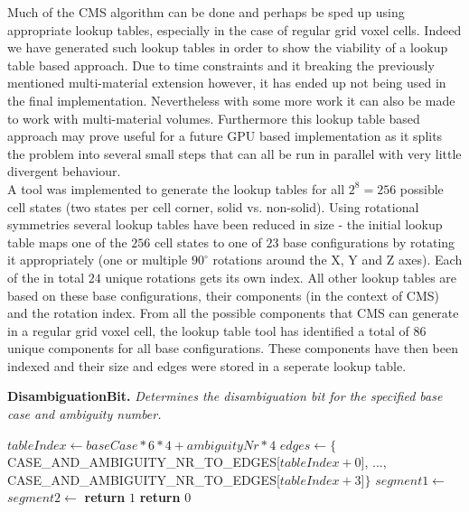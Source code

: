 Much of the CMS algorithm can be done and perhaps be sped up using appropriate lookup tables, especially in the case of regular grid voxel cells. Indeed we have generated such lookup tables in order to show
the viability of a lookup table based approach. Due to time constraints and it breaking the previously mentioned multi-material extension however, it has ended up not being used in the final implementation.
Nevertheless with some more work it can also be made to work with multi-material volumes. Furthermore this lookup table based approach may prove useful for a future GPU based implementation as it splits
the problem into several small steps that can all be run in parallel with very little divergent behaviour.\\
A tool was implemented to generate the lookup tables for all $2^8 = 256$ possible cell states (two states per cell corner, solid vs. non-solid). Using rotational symmetries several lookup tables have been reduced in size - the initial lookup table maps one of the $256$ cell states to one of $23$ base configurations by rotating it appropriately (one or multiple $90^{\circ}$ rotations around the X, Y and Z axes). Each of the in total $24$ unique rotations gets its own index.
All other lookup tables are based on these base configurations, their components (in the context of CMS) and the rotation index.
From all the possible components that CMS can generate in a regular grid voxel cell, the lookup table tool has identified a total of $86$ unique components for all base configurations. These components have
then been indexed and their size and edges were stored in a seperate lookup table.\\

\begin{algorithm}[H]
\caption{\textbf{DisambiguationBit.} \textit{Determines the disambiguation bit for the specified base case and ambiguity number.}}\label{alg:cms_lt_disambiguation_bit}
\begin{algorithmic}[1]
	\State $tableIndex \gets baseCase * 6 * 4 + ambiguityNr * 4$
	\State $edges \gets \{$CASE\_AND\_AMBIGUITY\_NR\_TO\_EDGES[$tableIndex + 0$],
	\Statex ..., CASE\_AND\_AMBIGUITY\_NR\_TO\_EDGES[$tableIndex + 3$]$\}$
	\State $segment1 \gets $ 
	\State {}
	\State $segment2 \gets $
	\State {}
		\State \textbf{return} $1$
	\Else
		\State \textbf{return} $0$
	\EndIf
\EndProcedure
\end{algorithmic}
\end{algorithm}

